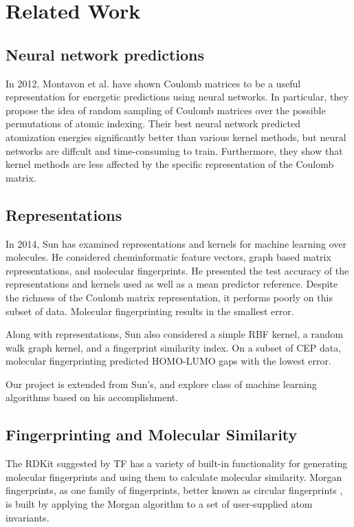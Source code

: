 \chapter{Related Work}

\section{Neural network predictions}

In 2012, Montavon et al. \cite{montavon2012learning} have shown Coulomb matrices to be a useful representation for energetic predictions using neural networks. In particular, they propose the idea of random sampling of Coulomb matrices over the possible permutations of atomic indexing. Their best neural network predicted atomization energies significantly better than various kernel methods, but neural networks are diffcult and time-consuming to train. Furthermore, they show that kernel methods are less affected by the specific representation of the Coulomb matrix.

\section{Representations}

In 2014, Sun \cite{sun2014learning} has examined representations and kernels for machine learning over molecules. He considered cheminformatic feature vectors, graph based matrix representations, and molecular fingerprints. He presented the test accuracy of the representations and kernels used as well as a mean predictor reference. Despite the richness of the Coulomb matrix representation, it performs poorly on this subset of data. Molecular fingerprinting results in the smallest error.

Along with representations, Sun \cite{sun2014learning} also considered a simple RBF kernel, a random walk graph kernel, and a fingerprint similarity index. On a subset of CEP data, molecular fingerprinting predicted HOMO-LUMO gaps with the lowest error.

Our project is extended from Sun's, and explore class of machine learning algorithms based on his accomplishment.

\section{Fingerprinting and Molecular Similarity}

The RDKit suggested by TF has a variety of built-in functionality for generating molecular fingerprints and using them to calculate molecular similarity. Morgan fingerprints, as one family of fingerprints, better known as circular fingerprints \cite{rogers2010extended}, is built by applying the Morgan algorithm to a set of user-supplied atom invariants. 

